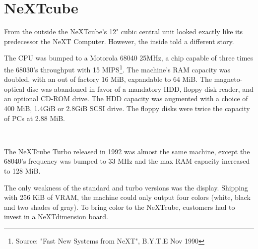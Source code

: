 
\section{NeXTcube}
From the outside the NeXTcube's 12" cubic central unit looked exactly like its predecessor the NeXT Computer. However, the inside told a different story.\\
\par
 The CPU was bumped to a Motorola 68040 25MHz, a chip capable of three times the 68030's throughput with 15 MIPS\footnote{Source: "Fast New Systems from NeXT", B.Y.T.E Nov 1990}. The machine's RAM capacity was doubled, with an out of factory 16 MiB, expandable to 64 MiB. The magneto-optical disc was abandoned in favor of a mandatory HDD, floppy disk reader, and an optional CD-ROM drive. The HDD capacity was augmented with a choice of 400 MiB, 1.4GiB or 2.8GiB SCSI drive. The floppy disks were twice the capacity of PCs at 2.88 MiB.\\
\par
\begin{minipage}{\textwidth}
 \\
\end{minipage}

\par
The NeXTcube Turbo released in 1992 was almost the same machine, except the 68040's frequency was bumped to 33 MHz and the max RAM capacity increased to 128 MiB.\\
\par
The only weakness of the standard and turbo versions was the display. Shipping with 256 KiB of VRAM, the machine could only output four colors (white, black and two shades of gray). To bring color to the NeXTcube, customers had to invest in a NeXTdimension board.\\
\par

\pagebreak


